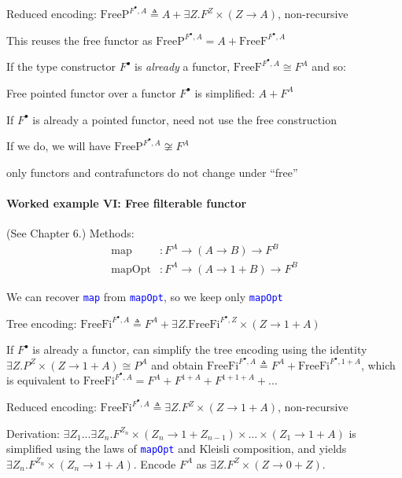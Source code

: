 Reduced encoding: {\footnotesize{}$\text{FreeP}^{F^{\bullet},A}\triangleq A+\exists Z.F^{Z}\times\left(Z\rightarrow A\right)$,
}non-recursive

This reuses the free functor as $\text{FreeP}^{F^{\bullet},A}=A+\text{FreeF}^{F^{\bullet},A}$

If the type constructor $F^{\bullet}$ is \emph{already} a functor,
$\text{FreeF}^{F^{\bullet},A}\cong F^{A}$ and so:

Free pointed functor over a functor $F^{\bullet}$ is simplified:
$A+F^{A}$

If $F^{\bullet}$ is already a pointed functor, need not use the free
construction

If we do, we will have $\text{FreeP}^{F^{\bullet},A}\not\cong F^{A}$ 

only functors and contrafunctors do not change under \textsf{``}free\textsf{''}


\paragraph{Worked example VI: Free filterable functor}

(See Chapter 6.) Methods:
\begin{align*}
\text{map} & :F^{A}\rightarrow\left(A\rightarrow B\right)\rightarrow F^{B}\\
\text{mapOpt} & :F^{A}\rightarrow\left(A\rightarrow1+B\right)\rightarrow F^{B}
\end{align*}

We can recover \texttt{\textcolor{blue}{\footnotesize{}map}} from
\texttt{\textcolor{blue}{\footnotesize{}mapOpt}}, so we keep only
\texttt{\textcolor{blue}{\footnotesize{}mapOpt}} 

Tree encoding: $\text{FreeFi}^{F^{\bullet},A}\triangleq F^{A}+\exists Z.\text{FreeFi}^{F^{\bullet},Z}\times\left(Z\rightarrow1+A\right)$

If $F^{\bullet}$ is already a functor, can simplify the tree encoding
using the identity $\exists Z.P^{Z}\times\left(Z\rightarrow1+A\right)\cong P^{A}$
and obtain $\text{FreeFi}^{F^{\bullet},A}\triangleq F^{A}+\text{FreeFi}^{F^{\bullet},1+A}$,
which is equivalent to $\text{FreeFi}^{F^{\bullet},A}=F^{A}+F^{1+A}+F^{1+1+A}+...$

Reduced encoding: $\text{FreeFi}^{F^{\bullet},A}\triangleq\exists Z.F^{Z}\times\left(Z\rightarrow1+A\right)$,
non-recursive

Derivation: $\exists Z_{1}...\exists Z_{n}.F^{Z_{n}}\times\left(Z_{n}\rightarrow1+Z_{n-1}\right)\times...\times\left(Z_{1}\rightarrow1+A\right)$
is simplified using the laws of \texttt{\textcolor{blue}{\footnotesize{}mapOpt}}
and Kleisli composition, and yields $\exists Z_{n}.F^{Z_{n}}\times\left(Z_{n}\rightarrow1+A\right)$.
Encode $F^{A}$ as $\exists Z.F^{Z}\times\left(Z\rightarrow0+Z\right)$.

